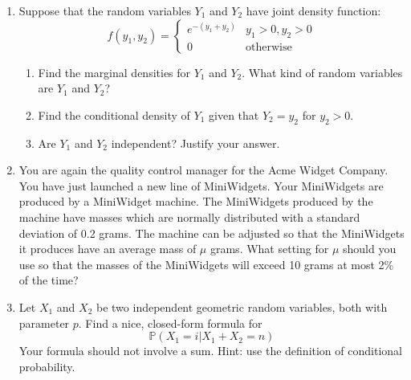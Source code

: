 \documentclass[12pt]{article}
\def\P{{\mathbb P}}
\begin{document}
\begin{enumerate}
\item Suppose that the random variables $Y_1$ and $Y_2$ have joint density function:
\[
f(y_1, y_2) = \begin{cases}
e^{-(y_1 + y_2)} & y_1 > 0, y_2 > 0 \\
0 & \text{otherwise}
\end{cases}
\]
\begin{enumerate}
\item Find the marginal densities for $Y_1$ and $Y_2$. What kind of random variables are $Y_1$ and $Y_2$?
\item Find the conditional density of $Y_1$ given that $Y_2 = y_2$ for $y_2 > 0$.
\item Are $Y_1$ and $Y_2$ independent? Justify your answer.
\end{enumerate}

\item You are again the quality control manager for the Acme Widget Company. You have just launched a new line of MiniWidgets. Your MiniWidgets are produced by a MiniWidget machine. The MiniWidgets produced by the machine have masses which are normally distributed with a standard deviation of 0.2 grams. The machine can be adjusted so that the MiniWidgets it produces have an average mass of $\mu$ grams. What setting for $\mu$ should you use so that the masses of the MiniWidgets will exceed 10 grams at most 2\% of the time?

\item Let $X_1$ and $X_2$ be two independent geometric random variables, both with parameter $p$. Find a nice, closed-form formula for
\[
\P(X_1 = i | X_1 + X_2 = n)
\]
Your formula should not involve a sum. Hint: use the definition of conditional probability.
\end{enumerate}
\end{document}
